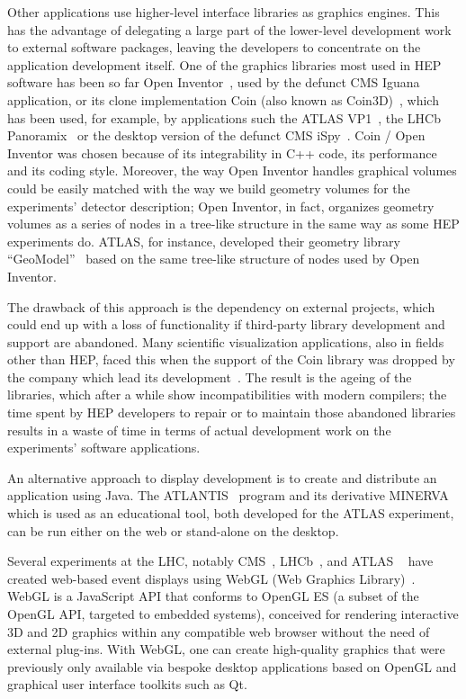 \documentclass[12pt,a4paper]{article}
\begin{document}
Other applications use higher-level interface libraries as graphics engines. This has the advantage of delegating
a large part of the lower-level development work to external software packages, leaving the developers to concentrate
on the application development itself. One of the graphics libraries most used in HEP software has been so far
Open Inventor~\cite{OpenInventor1993}, used by the defunct CMS Iguana~\cite{CMSIguana} application, or its clone implementation
Coin (also known as Coin3D)~\cite{Coin3D}, which has been used, for example, by applications such the ATLAS VP1~\cite{ATLASVP12010},
the LHCb Panoramix~\cite{LHCbPanoramix} or the desktop version of the defunct CMS iSpy~\cite{CMSISpy}. Coin / Open Inventor was
chosen because of its integrability in C++ code, its performance and its coding style. Moreover, the way Open Inventor handles
graphical volumes could be easily matched with the way we build geometry volumes for the experiments’ detector description;
Open Inventor, in fact, organizes geometry volumes
as a series of nodes in a tree-like structure in the same way as some HEP experiments do. ATLAS, for instance, developed their
geometry library “GeoModel”~\cite{ATLASGeoModel2004} based on the same tree-like structure of nodes used by Open Inventor.

The drawback  of this approach is the dependency on external projects, which could end up with a loss of functionality if
third-party library development and support are abandoned. Many scientific visualization applications, also in fields other than
HEP, faced this when the support of the Coin library was dropped by the company which lead its development~\cite{Coin3D}.
The result is the ageing of the libraries, which after a while show incompatibilities with modern compilers; the time
spent by HEP developers to repair or to maintain those abandoned libraries results in a waste of time in terms of actual development
work on the experiments’ software applications.

An alternative approach to display development is to create and distribute an application using Java. The ATLANTIS~\cite{ATLASAtlantis}
program and its derivative MINERVA~\cite{ATLASMinerva} which is used as an educational tool, both developed for the ATLAS experiment,
can be run either on the web or stand-alone on the desktop.


Several experiments at the LHC, notably CMS~\cite{CMSISpyWebGL}, LHCb~\cite{LHCbOnline2014}, and ATLAS
~\cite{ATLASTada2016, ATLASTracer2015} have created web-based event displays using WebGL (Web Graphics Library)~\cite{WebGL2011}.
WebGL is a JavaScript API that conforms to OpenGL ES (a subset of the OpenGL API, targeted to embedded systems), conceived for
rendering interactive 3D and 2D graphics within any compatible web browser without the need of external plug-ins. With WebGL,
one can create high-quality graphics that were previously only available via bespoke desktop applications based on OpenGL and
graphical user interface toolkits such as Qt.
\end{document}
